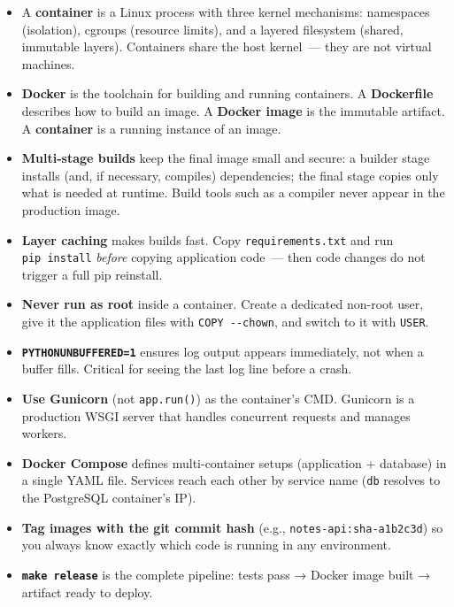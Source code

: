 \label{18-containerization:key-takeaways}
\begin{takeaways}

\begin{itemize}
\tightlist
\item
  A \textbf{container} is a Linux process with three kernel mechanisms: namespaces (isolation), cgroups (resource limits), and a layered filesystem (shared, immutable layers). Containers share the host kernel~--- they are not virtual machines.
\item
  \textbf{Docker} is the toolchain for building and running containers. A \textbf{Dockerfile} describes how to build an image. A \textbf{Docker image} is the immutable artifact. A \textbf{container} is a running instance of an image.
\item
  \textbf{Multi-stage builds} keep the final image small and secure: a builder stage installs (and, if necessary, compiles) dependencies; the final stage copies only what is needed at runtime. Build tools such as a compiler never appear in the production image.
\item
  \textbf{Layer caching} makes builds fast. Copy \texttt{requirements.txt} and run \texttt{pip\ install} \emph{before} copying application code~--- then code changes do not trigger a full pip reinstall.
\item
  \textbf{Never run as root} inside a container. Create a dedicated non-root user, give it the application files with \texttt{COPY\ -\/-chown}, and switch to it with \texttt{USER}.
\item
  \textbf{\texttt{PYTHONUNBUFFERED=}\allowbreak{}\texttt{1}} ensures log output appears immediately, not when a buffer fills. Critical for seeing the last log line before a crash.
\item
  \textbf{Use Gunicorn} (not \texttt{app.run()}) as the container's CMD. Gunicorn is a production WSGI server that handles concurrent requests and manages workers.
\item
  \textbf{Docker Compose} defines multi-container setups (application + database) in a single YAML file. Services reach each other by service name (\texttt{db} resolves to the PostgreSQL container's IP).
\item
  \textbf{Tag images with the git commit hash} (e.g., \texttt{notes-api:sha-a1b2c3d}) so you always know exactly which code is running in any environment.
\item
  \textbf{\texttt{make\ release}} is the complete pipeline: tests pass → Docker image built → artifact ready to deploy.
\end{itemize}

\end{takeaways}

